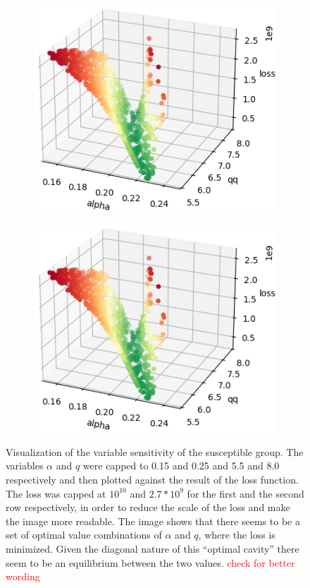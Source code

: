 \begin{figure}[h]
\begin{subfigure}[b]{0.4\textwidth}
		\includegraphics[width=\textwidth]{./figures/sensitivity/sensitivity_zoom2_0_2.png}	
	\end{subfigure}
	\begin{subfigure}[b]{0.4\textwidth}
		\centering
		\includegraphics[width=\textwidth]{./figures/sensitivity/sensitivity_zoom2_0_2.png}	
	\end{subfigure}
	\caption{Visualization of the variable sensitivity of the susceptible group. The variables $\alpha$ and $q$ were
		capped to 0.15 and 0.25 and 5.5 and 8.0 respectively and then plotted against the result of the loss function.
		The loss was capped at $10^{10}$ and $2.7*10^{9}$ for the first and the second row respectively, in order to
		reduce the scale of the loss and make the image more readable. The image shows that there seems to be a set of
		optimal value combinations of $\alpha$ and $q$, where the loss is minimized. Given the diagonal nature of this
		``optimal cavity'' there seem to be an equilibrium between the two values.
		\textcolor{red}{check for better wording} %
		}
	\label{fig:sensitivity_zoom1}
\end{figure}

